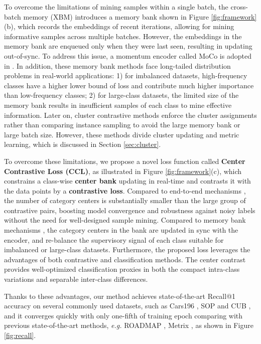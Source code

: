 \documentclass[10pt,twocolumn,letterpaper]{article}
\begin{document}
To overcome the limitations of mining samples within a single batch, the cross-batch memory (XBM) \cite{xbm} introduces a memory bank \cite{mb} shown in Figure \ref{fig:framework}(b), which records the embeddings of recent iterations, allowing for mining informative samples across multiple batches. However, the embeddings in the memory bank are enqueued only when they were last seen, resulting in updating out-of-sync. To address this issue, a momentum encoder called MoCo is adopted in \cite{moco,mocov3}. In addition, these memory bank methods face long-tailed distribution problems in real-world applications: 1) for imbalanced datasets, high-frequency classes have a higher lower bound of loss and contribute much higher importance than low-frequency classes; 2) for large-class datasets, the limited size of the memory bank results in insufficient samples of each class to mine effective information. Later on, cluster contrastive methods \cite{spcl,prism,cluster_contrast} enforce the cluster assignments rather than comparing instance sampling to avoid the large memory bank or large batch size. However, these methods divide cluster updating and metric learning, which is discussed in Section \ref{sec:cluster}.

To overcome these limitations, we propose a novel loss function called \textbf{Center Contrastive Loss (CCL)}, as illustrated in Figure \ref{fig:framework}(c), which constrains a class-wise \textbf{center bank} updating in real-time and contrasts it with the data points by a \textbf{contrastive loss}. 
Compared to end-to-end mechanisms \cite{facenet,npair,liftstruct,rll}, the number of category centers is substantially smaller than the large group of contrastive pairs, boosting model convergence and robustness against noisy labels without the need for well-designed sample mining. 
Compared to memory bank mechanisms \cite{xbm,mb,moco,mocov3}, the category centers in the bank are updated in sync with the encoder, and re-balance the supervisory signal of each class suitable for imbalanced or large-class datasets.
Furthermore, the proposed loss leverages the advantages of both contrastive and classification methods. The center contrast provides well-optimized classification proxies in both the compact intra-class variations and separable inter-class differences.



Thanks to these advantages, our method achieves state-of-the-art Recall@1 accuracy on several commonly used datasets, such as Cars196 \cite{car}, SOP \cite{liftstruct} and CUB \cite{cub}, and it converges quickly with only one-fifth of training epoch comparing with previous state-of-the-art methods, \textit{e.g.} ROADMAP \cite{roadmap}, Metrix \cite{metrix}, as shown in Figure \ref{fig:recall}.
\end{document}
